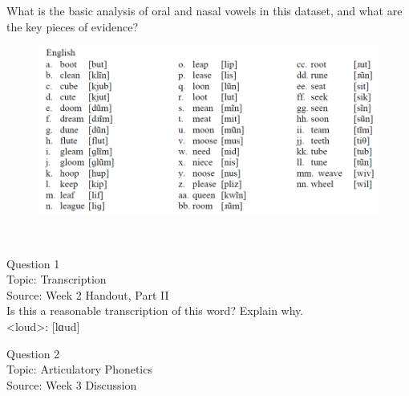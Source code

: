 \documentclass[12pt]{article}
\begin{document}
What is the basic analysis of oral and nasal vowels in this dataset, and what are the key pieces of evidence?\\

\begin{figure}[H]
\includegraphics{../images/english12.png}
\end{figure}

\newpage

\begin{center}
\textbf{{\color{red}{\HUGE END OF EXAM}}}\\

\end{center}
\newpage

\begin{center}
\textbf{{\color{blue}{\HUGE START OF EXAM\\}}}

\textbf{{\color{blue}{\HUGE Student ID: 41381\\}}}

\textbf{{\color{blue}{\HUGE \\}}}

\end{center}
\newpage

{\large Question 1}\\

Topic: Transcription\\
Source: Week 2 Handout, Part II\\

Is this a reasonable transcription of this word? Explain why.\\

<loud>: {[lɑud]}


\newpage

{\large Question 2}\\

Topic: Articulatory Phonetics\\
Source: Week 3 Discussion\\
\end{document}
